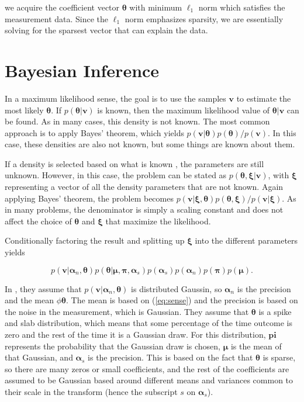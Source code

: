 \documentclass{IEEEtran}
\newcommand{\bftheta}{\mathbf{\theta}}
\begin{document}
we acquire the coefficient vector $\bftheta$ with minimum $\ell_1$ norm which satisfies the measurement data.  Since the $\ell_1$ norm emphasizes sparsity, we are essentially solving for the sparsest vector that can explain the data.

\section{Bayesian Inference}

In a maximum likelihood sense, the goal is to use the samples
$\mathbf{v}$ to estimate the most likely $\mathbf{\theta}$.  If $p(\mathbf{\theta}|\mathbf{v})$ is known, then the
maximum likelihood value of $\mathbf{\theta}|\mathbf{v}$ can be
found.  As in many cases, this density is not known.  The most common
approach is to apply Bayes' theorem, which yields
$p(\mathbf{v}|\mathbf{\theta})p(\mathbf{\theta})/p(\mathbf{v})$.  In
  this case, these densities are also not known, but some things are
  known about them.

If a density is selected based on what is known , the parameters are
still unknown.  However, in this case, the problem can be stated as
$p(\mathbf{\theta},\mathbf{\xi}|\mathbf{v})$, with $\mathbf{\xi}$
representing a vector of all the density parameters that are not
known.  Again applying Bayes' theorem, the problem becomes
$p(\mathbf{v}|\mathbf{\xi},\mathbf{\theta})p(\mathbf{\theta},\mathbf{\xi})/p(\mathbf{v}|\mathbf{\xi})$.
As in many problems, the denominator is simply a scaling constant and
does not affect the choice of $\mathbf{\theta}$ and $\mathbf{\xi}$
that maximize the likelihood.  

Conditionally factoring the result and splitting up $\mathbf{\xi}$
into the different parameters yields

\begin{equation}
p(\mathbf{v}|\mathbf{\alpha}_n,\mathbf{\theta})p(\mathbf{\theta}|\mathbf{\mu},\mathbf{\pi},\mathbf{\alpha}_s)p(\mathbf{\alpha}_s)p(\mathbf{\alpha}_n)p(\mathbf{\pi})p(\mathbf{\mu}).
\label{bayesprimary}
\end{equation}

In \cite{He09}, they assume that
$p(\mathbf{v}|\mathbf{\alpha}_n,\mathbf{\theta})$ is distributed Gaussin,
so $\mathbf{\alpha}_n$ is the precision and the mean $\phi
\mathbf{\theta}$.  The mean is based on (\ref{eq:sense}) and the
precision is based on the noise in the measurement, which is
Gaussian.  They assume that $\mathbf{\theta}$ is a spike
and slab distribution, which means that some percentage of the time
outcome is zero and the rest of the time it is a Gaussian draw.  For this distribution,
$\mathbf{pi}$ represents the probability that the Gaussian draw is
chosen, $\mathbf{\mu}$ is the mean of that Gaussian, and
$\mathbf{\alpha}_s$ is the precision.  This is based on the fact that
$\mathbf{\theta}$ is sparse, so there are many zeros or small
coefficients, and the rest of the coefficients are assumed to be
Gaussian based around different means and variances common to their
scale in the transform (hence the subscript $s$ on
$\mathbf{\alpha}_s$).
\end{document}
